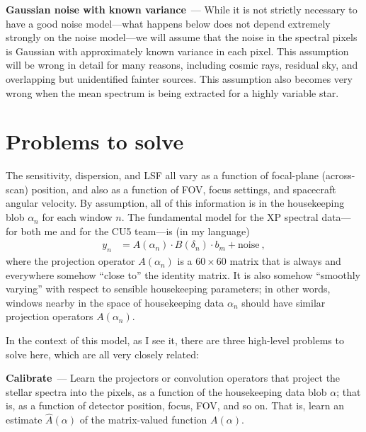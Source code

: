 \documentclass[11pt]{article}
\renewcommand{\paragraph}[1]{\medskip\par\noindent\textbf{#1}~---}
\begin{document}
\paragraph{Gaussian noise with known variance}
While it is not strictly necessary to have a good noise model---what happens below does not depend extremely strongly on the noise model---we will assume that the noise in the spectral pixels is Gaussian with approximately known variance in each pixel.
This assumption will be wrong in detail for many reasons, including cosmic rays, residual sky, and overlapping but unidentified fainter sources.
This assumption also becomes very wrong when the mean spectrum is being extracted for a highly variable star.

\section{Problems to solve}

The sensitivity, dispersion, and LSF all vary as a function of focal-plane (across-scan) position, and also as a function of FOV, focus settings, and spacecraft angular velocity.
By assumption, all of this information is in the housekeeping blob $\alpha_n$ for each window $n$.
The fundamental model for the XP spectral data---for both me and for the CU5 team---is (in my language)
\begin{align}
    y_n &= A(\alpha_n)\cdot B(\delta_n)\cdot b_m + \mbox{noise} ~,\label{eq:A}
\end{align}
where the projection operator $A(\alpha_n)$ is a $60\times 60$ matrix that is always and everywhere somehow ``close to'' the identity matrix.
It is also somehow ``smoothly varying'' with respect to sensible housekeeping parameters; in other words, windows nearby in the space of housekeeping data $\alpha_n$ should have similar projection operators $A(\alpha_n)$.

In the context of this model, as I see it, there are three high-level problems to solve here, which are all very closely related:

\paragraph{Calibrate}
Learn the projectors or convolution operators that project the stellar spectra into the pixels, as a function of the housekeeping data blob $\alpha$; that is, as a function of detector position, focus, FOV, and so on.
That is, learn an estimate $\hat{A}(\alpha)$ of the matrix-valued function $A(\alpha)$.
\end{document}
